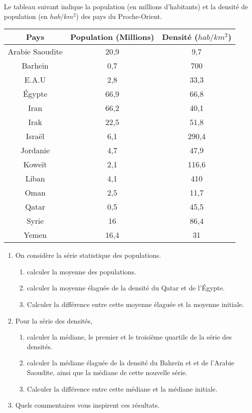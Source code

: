 
Le tableau suivant indique la population (en millions d’habitants) et la densité de population (en $hab/km^2$) des pays du Proche-Orient.

\begin{tabular}{|c|c|c|}
\hline 
Pays & Population (Millions) & Densité ($hab/km^2$) \\ 
\hline 
Arabie Saoudite & 20,9 & 9,7 \\ 
\hline 
Barhein & 0,7 & 700 \\ 
\hline 
E.A.U & 2,8 & 33,3 \\ 
\hline 
Égypte & 66,9 & 66,8 \\ 
\hline 
Iran & 66,2 & 40,1 \\ 
\hline 
Irak & 22,5 & 51,8 \\ 
\hline 
Israël & 6,1 & 290,4 \\ 
\hline 
Jordanie & 4,7 & 47,9 \\ 
\hline 
Koweït & 2,1 & 116,6 \\ 
\hline 
Liban & 4,1 & 410 \\ 
\hline 
Oman & 2,5 & 11,7 \\ 
\hline 
Qatar & 0,5 & 45,5 \\ 
\hline 
Syrie & 16 & 86,4 \\ 
\hline 
Yemen & 16,4 & 31 \\ 
\hline 
\end{tabular} 

\begin{enumerate}
\item On considère la série statistique des populations.
\begin{enumerate}
\item calculer la moyenne des populations.
\item calculer la moyenne élaguée de la densité du Qatar et de l'Égypte.
\item  Calculer la différence entre cette moyenne élaguée et la moyenne initiale.
\end{enumerate}
\item Pour la série des densités,
\begin{enumerate}
\item  calculer la médiane, le premier et le troisième quartile de la série des densités.
\item  calculer la médiane élaguée de la densité du Bahreïn et et de l'Arabie Saoudite, ainsi que la médiane de cette nouvelle série.
\item  Calculer la différence entre cette médiane et la médiane initiale.
\end{enumerate}
\item Quels commentaires vous inspirent ces résultats.

\end{enumerate}
